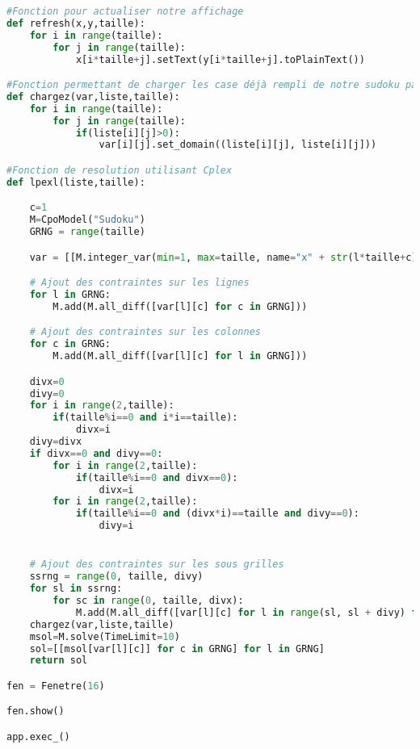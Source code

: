 \begin{lstlisting}[language=Python]
#Fonction pour actualiser notre affichage
def refresh(x,y,taille):
    for i in range(taille):
        for j in range(taille):
            x[i*taille+j].setText(y[i*taille+j].toPlainText())

#Fonction permettant de charger les case déjà rempli de notre sudoku parmi nos contraintes
def chargez(var,liste,taille):
    for i in range(taille):
        for j in range(taille):
            if(liste[i][j]>0):
                var[i][j].set_domain((liste[i][j], liste[i][j]))

#Fonction de resolution utilisant Cplex
def lpexl(liste,taille):

    c=1
    M=CpoModel("Sudoku")
    GRNG = range(taille)

    var = [[M.integer_var(min=1, max=taille, name="x" + str(l*taille+c)) for l in range(taille)] for c in range(taille)]

    # Ajout des contraintes sur les lignes
    for l in GRNG:
        M.add(M.all_diff([var[l][c] for c in GRNG]))

    # Ajout des contraintes sur les colonnes
    for c in GRNG:
        M.add(M.all_diff([var[l][c] for l in GRNG]))

    divx=0
    divy=0
    for i in range(2,taille):
        if(taille%i==0 and i*i==taille):
            divx=i
    divy=divx
    if divx==0 and divy==0:
        for i in range(2,taille):
            if(taille%i==0 and divx==0):
                divx=i
        for i in range(2,taille):
            if(taille%i==0 and (divx*i)==taille and divy==0):
                divy=i


    # Ajout des contraintes sur les sous grilles
    ssrng = range(0, taille, divy)
    for sl in ssrng:
        for sc in range(0, taille, divx):
            M.add(M.all_diff([var[l][c] for l in range(sl, sl + divy) for c in range(sc, sc + divx)]))
    chargez(var,liste,taille)
    msol=M.solve(TimeLimit=10)
    sol=[[msol[var[l][c]] for c in GRNG] for l in GRNG]
    return sol

fen = Fenetre(16)

fen.show()

app.exec_()


\end{lstlisting}
